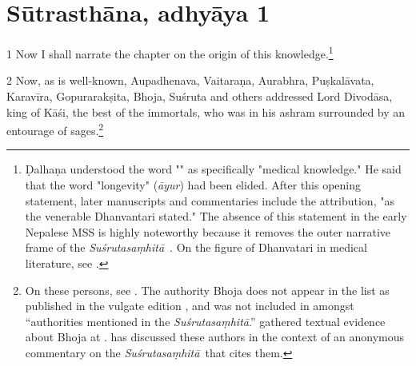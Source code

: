 \documentclass[12pt]{article}
\renewcommand{\SS}{\emph{Suśrutasaṃhitā}}
\let\se\saneng  %
\begin{document}
    \section{Sūtrasthāna, adhyāya 1}
    
\begin{translation}

    \item[1] Now I shall narrate the chapter on the origin of this
knowledge.\footnote{Ḍalhaṇa understood the word "\se{veda}{knowledge}" as
specifically "medical knowledge." He said that the word "longevity"
(\emph{āyur})  had been elided.
%    
%    
%    
After this opening statement, later manuscripts and commentaries include
the attribution, "as the venerable Dhanvantari stated."  The absence of this
statement in the early Nepalese MSS is highly noteworthy because it removes
the outer narrative frame of the \SS\
\parencites[148]{wuja-2013}[\S\,3.1.2]{kleb-2021b}.  On the figure of Dhanvatari in 
medical literature, see \cite[IA 358--361]{meul-hist}.} %
    
    \item[2] Now, as is well-known, Aupadhenava, Vaitaraṇa, Aurabhra, Puṣkalāvata,
Karavīra, Gopurarakṣita, Bhoja, Suśruta and others addressed Lord Divodāsa,
king of Kāśi, the best of the immortals, who was in his ashram surrounded by
an entourage of sages.\footnote{On these persons, see \cite[IA
361--363, 369\,ff.]{meul-hist}. The authority Bhoja does not appear in the list as
published in the vulgate edition \citep[1]{susr-trikamji2}, and was not
included in \cite{meul-hist} amongst “authorities mentioned in the \SS.” 
\citeauthor{meul-hist} gathered textual evidence about Bhoja at \cite[IA
690--691]{meul-hist}. \citet{kleb-2021a} has discussed these authors in the
context of an anonymous commentary on the \SS\ that cites them.}

\nocite{emen-1969}
    
    

\end{translation}
\end{document}
